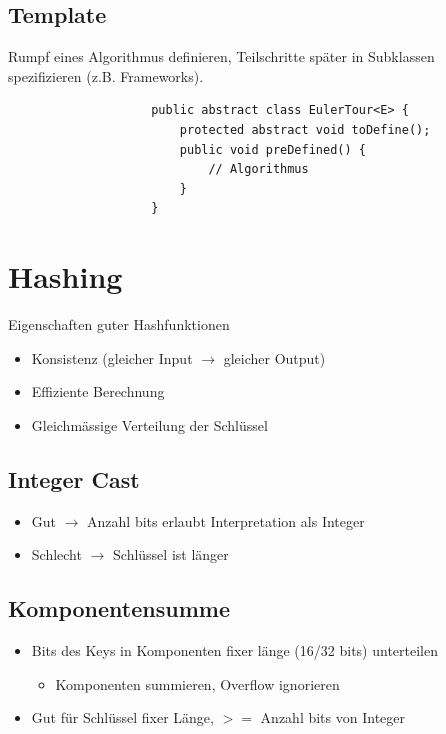\documentclass[a4paper, landscape, 8pt]{scrartcl}
\begin{document}
\begin{multicols*}{4}
\begin{lstlisting}
                \end{lstlisting}
            \subsection{Template}
                Rumpf eines Algorithmus definieren, Teilschritte später in Subklassen spezifizieren (z.B. Frameworks).
                \begin{lstlisting}
                    public abstract class EulerTour<E> {
                        protected abstract void toDefine();
                        public void preDefined() {
                            // Algorithmus
                        }
                    }
                \end{lstlisting}

        \section{Hashing}
            \textcolor{subsectioncolor}{Eigenschaften guter Hashfunktionen}
            \begin{itemize}
                \item Konsistenz (gleicher Input $\to$ gleicher Output)
                \item Effiziente Berechnung
                \item Gleichmässige Verteilung der Schlüssel
            \end{itemize}

            \subsection{Integer Cast}
                \begin{itemize}
                    \item Gut $\to$ Anzahl bits erlaubt Interpretation als Integer
                    \item Schlecht $\to$ Schlüssel ist länger
                \end{itemize}

            \subsection{Komponentensumme}
                \begin{itemize}
                    \item Bits des Keys in Komponenten fixer länge (16/32 bits) unterteilen
                    \begin{itemize}
                        \item Komponenten summieren, Overflow ignorieren
                    \end{itemize}
                    \item Gut für Schlüssel fixer Länge, $>=$ Anzahl bits von Integer
                \end{itemize}


\end{multicols*}
\end{document}
